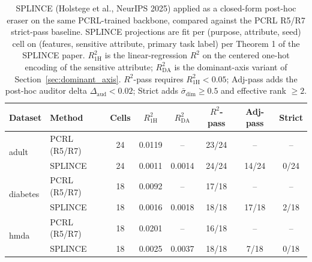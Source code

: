 \begin{table}[t]
\centering
\small
\begin{tabular}{l l c c c c c c}
\toprule
Dataset & Method & Cells & $R^2_{\text{1H}}$ & $R^2_{\text{DA}}$ & $R^2$-pass & Adj-pass & Strict \\
\midrule
\multirow{2}{*}{adult} & PCRL (R5/R7) & 24 & 0.0119 & -- & 23/24 & -- & -- \\
& SPLINCE & 24 & 0.0011 & 0.0014 & 24/24 & 14/24 & 0/24 \\
\midrule
\multirow{2}{*}{diabetes} & PCRL (R5/R7) & 18 & 0.0092 & -- & 17/18 & -- & -- \\
& SPLINCE & 18 & 0.0016 & 0.0018 & 18/18 & 17/18 & 2/18 \\
\midrule
\multirow{2}{*}{hmda} & PCRL (R5/R7) & 18 & 0.0201 & -- & 16/18 & -- & -- \\
& SPLINCE & 18 & 0.0025 & 0.0037 & 18/18 & 7/18 & 0/18 \\
\bottomrule
\end{tabular}
\caption{SPLINCE (Holstege et al., NeurIPS 2025) applied as a closed-form post-hoc eraser on the same PCRL-trained backbone, compared against the PCRL R5/R7 strict-pass baseline. SPLINCE projections are fit per (purpose, attribute, seed) cell on (features, sensitive attribute, primary task label) per Theorem 1 of the SPLINCE paper. $R^2_{\text{1H}}$ is the linear-regression $R^2$ on the centered one-hot encoding of the sensitive attribute; $R^2_{\text{DA}}$ is the dominant-axis variant of Section~\ref{sec:dominant_axis}. $R^2$-pass requires $R^2_{\text{1H}} < 0.05$; Adj-pass adds the post-hoc auditor delta $\Delta_{\text{aud}} < 0.02$; Strict adds $\bar{\sigma}_{\text{dim}} \geq 0.5$ and effective rank $\geq 2$.}
\label{tab:splince_vs_pcrl}
\end{table}
